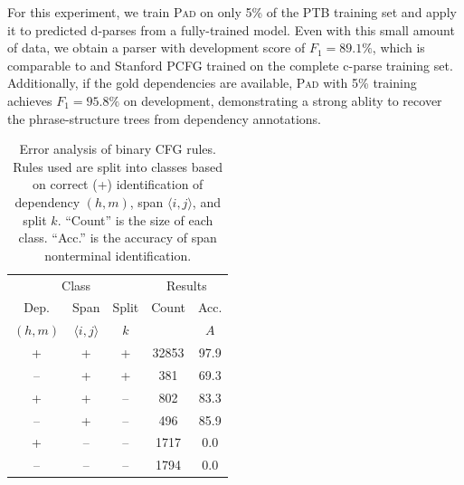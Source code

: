 \documentclass[11pt,letterpaper]{article}
\newcommand{\Span}[1]{\langle #1 \rangle}
\newcommand{\ParseName}{\textsc{Pad}\xspace}
\begin{document}
For this experiment, we train \ParseName on only 5\% of the PTB training set and apply it to predicted d-parses from a fully-trained model. Even with this small amount of 
data, we obtain a parser with development score of  $F_1 = 89.1\%$, which is comparable to  and Stanford PCFG \cite{klein2003accurate} trained on the complete c-parse training set. Additionally, if the gold dependencies are available, \ParseName{} with 5\% training achieves $F_1 = 95.8\%$ on development, demonstrating a strong ablity to recover the phrase-structure trees from dependency annotations.










\begin{table}
  \centering
  \footnotesize
  \begin{tabular}{ccccc}
    \toprule
    \multicolumn{3}{c}{Class} & \multicolumn{2}{c}{Results} \\
    Dep. & Span & Split & Count & Acc.  \\ 
    $(h, m)$ & $\Span{i,j}$ & $k$ &  & $A$ \\ 
    \midrule
    + & + & +  &  32853 &  97.9   \\ 
    -- & + & +  &  381 & 69.3   \\ 
    + & + & --  &  802   & 83.3   \\ 
    -- & + & --  &  496 & 85.9   \\ 
    + & -- & --  &  1717 & 0.0    \\ 
    -- & -- & --  &  1794 & 0.0    \\ 
    \bottomrule
  \end{tabular}
  \caption{Error analysis of binary CFG rules. Rules used are split into classes based on 
    correct (+) identification of dependency $(h,m)$, span $\Span{i,j}$, and split $k$. 
    ``Count'' is the size of each class. ``Acc.'' is the accuracy of span nonterminal identification. \label{tab:analysis}}
\end{table}
\end{document}
